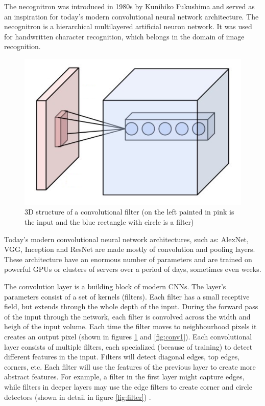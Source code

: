 \documentclass[times, utf8, diplomski]{fer}
\begin{document}
The necognitron was introduced in 1980s by Kunihiko Fukushima \citep{fukushima_neocognitron:_1982, eckmiller_hierarchical_1989} and served as an inspiration for today's modern convolutional neural network architecture. The necognitron is a hierarchical multilayered artificial neuron network. It was used for handwritten character recognition, which belongs in the domain of image recognition.

\begin{figure}
  \includegraphics[scale=0.5]{figures/conv.png}
  \centering
  \caption{3D structure of a convolutional filter (on the left painted in pink is the input and the blue rectangle with circle is a filter)}
  \label{fig:conv}
\end{figure}

Today's modern convolutional neural network architectures, such as: AlexNet, VGG, Inception and ResNet \citep{krizhevsky_imagenet_2012, simonyan_very_2014, szegedy_going_2015, he_deep_2016} are made mostly of convolution and pooling layers. These architecture have an enormous number of parameters and are trained on powerful GPUs or clusters of servers over a period of days, sometimes even weeks.

The convolution layer is a building block of modern CNNs. The layer's parameters consist of a set of kernels (filters). Each filter has a small receptive field, but extends through the whole depth of the input. During the forward pass of the input through the network, each filter is convolved across the width and heigh of the input volume. Each time the filter moves to neighbourhood pixels it creates an output pixel (shown in figures \ref{fig:conv} and \ref{fig:conv1}). Each convolutional layer consists of multiple filters, each specialized (because of training) to detect different features in the input. Filters will detect diagonal edges, top edges, corners, etc. Each filter will use the features of the previous layer to create more abstract features. For example, a filter in the first layer might capture edges, while filters in deeper layers may use the edge filters to create corner and circle detectors (shown in detail in figure \ref{fig:filter}) \citep{simonyan_very_2014}.
\end{document}
